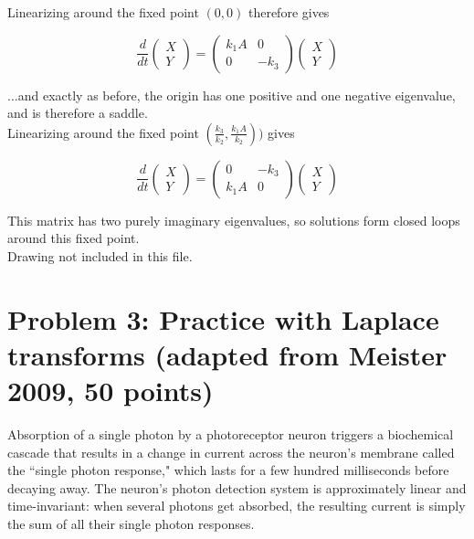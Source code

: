 \documentclass{article}
\begin{document}
\begin{enumerate}[a)]
{Linearizing around the fixed point $(0,0)$ therefore gives

\[ \frac{d}{dt} \begin{pmatrix} X\\Y\end{pmatrix} = \begin{pmatrix} k_1 A & 0\\ 0 & - k_3 \end{pmatrix} \begin{pmatrix} X\\Y\end{pmatrix} \]

$\ldots$and exactly as before, the origin has one positive and one negative eigenvalue, and is therefore a saddle.\\

Linearizing around the fixed point $(\frac{k_3}{k_2}, \frac{k_1A}{k_2}))$ gives

\[ \frac{d}{dt} \begin{pmatrix} X\\Y\end{pmatrix} = \begin{pmatrix} 0 & -k_3 \\ k_1 A & 0 \end{pmatrix} \begin{pmatrix} X\\Y\end{pmatrix} \]

This matrix has two purely imaginary eigenvalues, so solutions form closed loops around this fixed point.\\

Drawing not included in this file.

}

\end{enumerate}

\section*{Problem 3: Practice with Laplace transforms (adapted from Meister 2009, 50 points)}

Absorption of a single photon by a photoreceptor neuron triggers a biochemical cascade that results in a change in current across the neuron's membrane called the ``single photon response," which lasts for a few hundred milliseconds before decaying away. The neuron's photon detection system is approximately linear and time-invariant: when several photons get absorbed, the resulting current is simply the sum of all their single photon responses.
\end{document}
